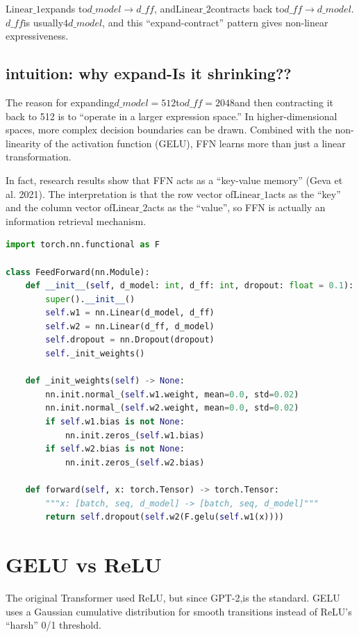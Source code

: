 $\text{Linear}\_1$expands to$d\_{model} \to d\_{ff}$, and$\text{Linear}\_2$contracts back to$d\_{ff} \to d\_{model}$.$d\_{ff}$is usually$4 d\_{model}$, and this ``expand-contract'' pattern gives non-linear expressiveness.

\subsection{intuition: why expand-Is it shrinking??}

The reason for expanding$d\_{model} = 512$to$d\_{ff} = 2048$and then contracting it back to 512 is to ``operate in a larger expression space.'' In higher-dimensional spaces, more complex decision boundaries can be drawn. Combined with the non-linearity of the activation function (GELU), FFN learns more than just a linear transformation.

In fact, research results show that FFN acts as a ``key-value memory'' (Geva et al. 2021).  The interpretation is that the row vector of$\text{Linear}\_1$acts as the ``key'' and the column vector of$\text{Linear}\_2$acts as the ``value'', so FFN is actually an information retrieval mechanism.

\begin{lstlisting}[language=Python]
import torch.nn.functional as F

class FeedForward(nn.Module):
    def __init__(self, d_model: int, d_ff: int, dropout: float = 0.1):
        super().__init__()
        self.w1 = nn.Linear(d_model, d_ff)
        self.w2 = nn.Linear(d_ff, d_model)
        self.dropout = nn.Dropout(dropout)
        self._init_weights()

    def _init_weights(self) -> None:
        nn.init.normal_(self.w1.weight, mean=0.0, std=0.02)
        nn.init.normal_(self.w2.weight, mean=0.0, std=0.02)
        if self.w1.bias is not None:
            nn.init.zeros_(self.w1.bias)
        if self.w2.bias is not None:
            nn.init.zeros_(self.w2.bias)

    def forward(self, x: torch.Tensor) -> torch.Tensor:
        """x: [batch, seq, d_model] -> [batch, seq, d_model]"""
        return self.dropout(self.w2(F.gelu(self.w1(x))))
\end{lstlisting}

\section{GELU vs ReLU}

The original Transformer used ReLU, but since GPT-2,is the standard. GELU uses a Gaussian cumulative distribution for smooth transitions instead of ReLU's ``harsh'' 0/1 threshold.

